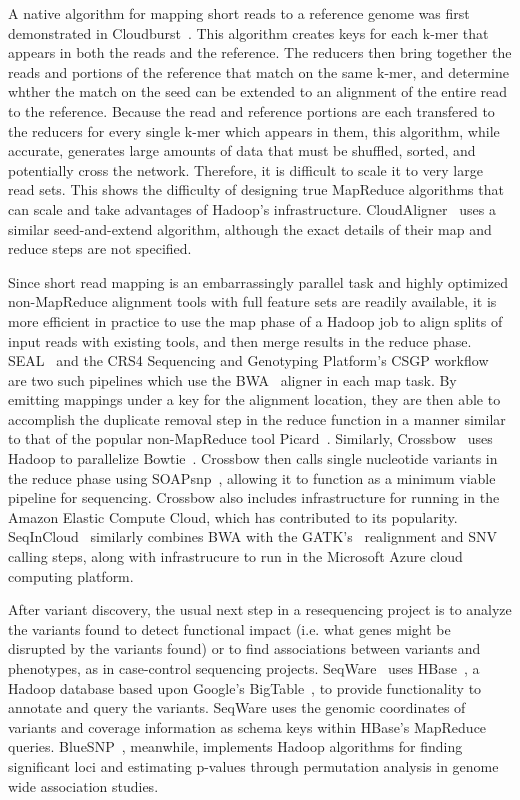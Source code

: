 A native algorithm for mapping short reads to a reference genome was first demonstrated in Cloudburst~\cite{Schatz:2009p278}. This algorithm creates keys for each k-mer that appears in both the reads and the reference. The reducers then bring together the reads and portions of the reference that match on the same k-mer, and determine whther the match on the seed can be extended to an alignment of the entire read to the reference. Because the read and reference portions are each transfered to the reducers for every single k-mer which appears in them, this algorithm, while accurate, generates large amounts of data that must be shuffled, sorted, and potentially cross the network. Therefore, it is difficult to scale it to very large read sets. This shows the difficulty of designing true MapReduce algorithms that can scale and take advantages of Hadoop's infrastructure. CloudAligner~\cite{Nguyen:2011p1832} uses a similar seed-and-extend algorithm, although the exact details of their map and reduce steps are not specified.

Since short read mapping is an embarrassingly parallel task and highly optimized non-MapReduce alignment tools with full feature sets are readily available, it is more efficient in practice to use the map phase of a Hadoop job to align splits of input reads with existing tools, and then merge results in the reduce phase. SEAL~\cite{Pireddu:2011fj} and the CRS4 Sequencing and Genotyping Platform's CSGP workflow~\cite{Pireddu:2011:MGS:1996092.1996106} are two such pipelines which use the BWA~\cite{Li:2009p836} aligner in each map task. By emitting mappings under a key for the alignment location, they are then able to accomplish the duplicate removal step in the reduce function in a manner similar to that of the popular non-MapReduce tool Picard~\cite{picard}. Similarly, Crossbow~\cite{Langmead:2009p1225} uses Hadoop to parallelize Bowtie~\cite{Langmead:2009p768}. Crossbow then calls single nucleotide variants in the reduce phase using SOAPsnp~\cite{Li:2009p1236}, allowing it to function as a minimum viable pipeline for sequencing. Crossbow also includes infrastructure for running in the Amazon Elastic Compute Cloud, which has contributed to its popularity. SeqInCloud~\cite{nabeel-bicob13-genome-analysis-cloud} similarly combines BWA with the GATK's~\cite{McKenna:2010p1051} realignment and SNV calling steps, along with infrastrucure to run in the Microsoft Azure cloud computing platform.

After variant discovery, the usual next step in a resequencing project is to analyze the variants found to detect functional impact (i.e. what genes might be disrupted by the variants found) or to find associations between variants and phenotypes, as in case-control sequencing projects. SeqWare~\cite{Oconnor:2010p1835} uses HBase~\cite{hbase}, a Hadoop database based upon Google's BigTable~\cite{Chang:2008:BDS:1365815.1365816}, to provide functionality to annotate and query the variants. SeqWare uses the genomic coordinates of variants and coverage information as schema keys within HBase's MapReduce queries. BlueSNP~\cite{Huang:2012bb}, meanwhile, implements Hadoop algorithms for finding significant loci and estimating p-values through permutation analysis in genome wide association studies.

